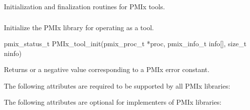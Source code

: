 Initialization and finalization routines for \ac{PMIx} tools.

\subsubsection{}

\summary

Initialize the \ac{PMIx} library for operating as a tool.

\format

\cspecificstart
\begin{codepar}
pmix_status_t
PMIx_tool_init(pmix_proc_t *proc,
               pmix_info_t info[], size_t ninfo)
\end{codepar}
\cspecificend

\begin{arglist}
\end{arglist}

Returns  or a negative value corresponding to a PMIx error constant.

\reqattrstart
The following attributes are required to be supported by all \ac{PMIx} libraries:


\reqattrend

\optattrstart
The following attributes are optional for implementers of \ac{PMIx} libraries:

